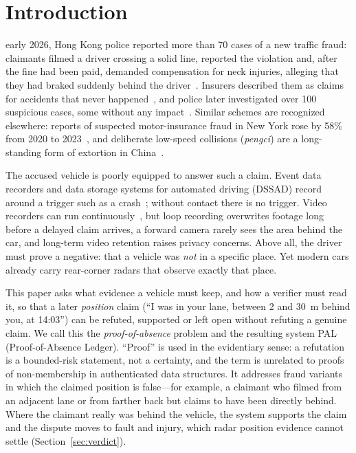 \section{Introduction}

 early 2026, Hong Kong police reported more than 70 cases of a new traffic fraud: claimants filmed a driver crossing a solid line, reported the violation and, after the fine had been paid, demanded compensation for neck injuries, alleging that they had braked suddenly behind the driver~\cite{b1,b3}. Insurers described them as claims for accidents that never happened~\cite{b2}, and police later investigated over 100 suspicious cases, some without any impact~\cite{b60}. Similar schemes are recognized elsewhere: reports of suspected motor-insurance fraud in New York rose by 58\% from 2020 to 2023~\cite{b5}, and deliberate low-speed collisions (\emph{pengci}) are a long-standing form of extortion in China~\cite{b6}.

The accused vehicle is poorly equipped to answer such a claim. Event data recorders and data storage systems for automated driving (DSSAD) record around a trigger such as a crash~\cite{b7,b8}; without contact there is no trigger. Video recorders can run continuously~\cite{b9}, but loop recording overwrites footage long before a delayed claim arrives, a forward camera rarely sees the area behind the car, and long-term video retention raises privacy concerns. Above all, the driver must prove a negative: that a vehicle was \emph{not} in a specific place. Yet modern cars already carry rear-corner radars that observe exactly that place.

This paper asks what evidence a vehicle must keep, and how a verifier must read it, so that a later \emph{position} claim (``I was in your lane, between 2 and 30~m behind you, at 14:03'') can be refuted, supported or left open without refuting a genuine claim. We call this the \emph{proof-of-absence} problem and the resulting system PAL (Proof-of-Absence Ledger). ``Proof'' is used in the evidentiary sense: a refutation is a bounded-risk statement, not a certainty, and the term is unrelated to proofs of non-membership in authenticated data structures. It addresses fraud variants in which the claimed position is false---for example, a claimant who filmed from an adjacent lane or from farther back but claims to have been directly behind. Where the claimant really was behind the vehicle, the system supports the claim and the dispute moves to fault and injury, which radar position evidence cannot settle (Section~\ref{sec:verdict}).

